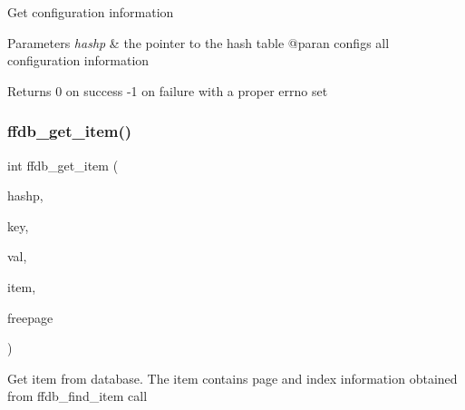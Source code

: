 Get configuration information


\begin{DoxyParams}{Parameters}
{\em hashp} & the pointer to the hash table @paran configs all configuration information\\
\hline
\end{DoxyParams}
\begin{DoxyReturn}{Returns}
0 on success -\/1 on failure with a proper errno set 
\end{DoxyReturn}
\mbox{\label{adat-devel_2other__libs_2filedb_2filehash_2ffdb__page_8c_a01023f0331a47b7f4dd66a1ab2008356}} 
\subsubsection{\texorpdfstring{ffdb\_get\_item()}{ffdb\_get\_item()}}
{\footnotesize\ttfamily int ffdb\+\_\+get\+\_\+item (\begin{DoxyParamCaption}\item[{\mbox{\hyperlink{adat-devel_2other__libs_2filedb_2filehash_2ffdb__hash_8h_ae592010ed2bedc975d3cc0b7d074b9d1}{ffdb\+\_\+htab\+\_\+t}} $\ast$}]{hashp,  }\item[{const \mbox{\hyperlink{adat-devel_2other__libs_2filedb_2filehash_2ffdb__db_8h_aa2e0984399491df0fdd20898ca8758f9}{F\+F\+D\+B\+\_\+\+D\+BT}} $\ast$}]{key,  }\item[{\mbox{\hyperlink{adat-devel_2other__libs_2filedb_2filehash_2ffdb__db_8h_aa2e0984399491df0fdd20898ca8758f9}{F\+F\+D\+B\+\_\+\+D\+BT}} $\ast$}]{val,  }\item[{\mbox{\hyperlink{adat-devel_2other__libs_2filedb_2filehash_2ffdb__hash_8h_aa1cea5ccbd6513ed152988f7a71a936d}{ffdb\+\_\+hent\+\_\+t}} $\ast$}]{item,  }\item[{int}]{freepage }\end{DoxyParamCaption})}

Get item from database. The item contains page and index information obtained from ffdb\+\_\+find\+\_\+item call


